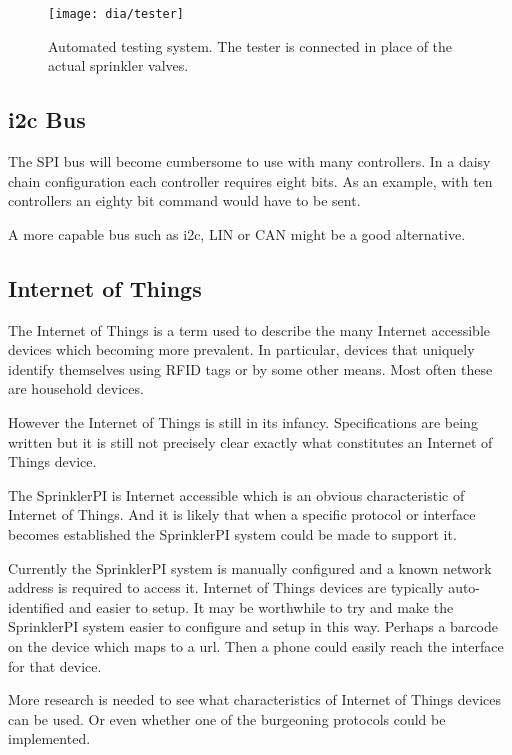 \documentclass{article}
\begin{document}
\begin{figure}[htbp!]
\begin{center}
\texttt{[image: dia/tester]}
\end{center}
\caption{Automated testing system.
The tester is connected in place of the actual sprinkler valves.}
\label{fig:tester}
\end{figure}

\subsection{i2c Bus}

The SPI bus will become cumbersome to use with many
controllers.
In a daisy chain configuration each controller requires
eight bits.
As an example, with ten controllers an eighty bit command
would have to be sent.

A more capable bus such as i2c, LIN or CAN might be a good alternative.

\subsection{Internet of Things}

The Internet of Things\autocite{wiki:iot} is a term used to describe
the many Internet accessible devices which becoming more prevalent.
In particular, devices that uniquely identify themselves using RFID
tags or by some other means.
Most often these are household devices.

However the Internet of Things is still in its infancy.
Specifications are being written but it is still not precisely
clear exactly what constitutes an Internet of Things device.

The SprinklerPI is Internet accessible which is an obvious
characteristic of Internet of Things.
And it is likely that when a specific protocol or interface becomes
established the SprinklerPI system could be made to support it.

Currently the SprinklerPI system is manually configured and a known
network address is required to access it.
Internet of Things devices are typically auto-identified and easier
to setup.
It may be worthwhile to try and make the SprinklerPI system easier
to configure and setup in this way.
Perhaps a barcode on the device which maps to a url.
Then a phone could easily reach the interface for that device.

More research is needed to see what characteristics of Internet of Things
devices can be used.
Or even whether one of the burgeoning protocols could be implemented.


\pagebreak
\glsaddall
\printglossaries

\clearpage
\printbibliography[heading=bibintoc]
\end{document}
